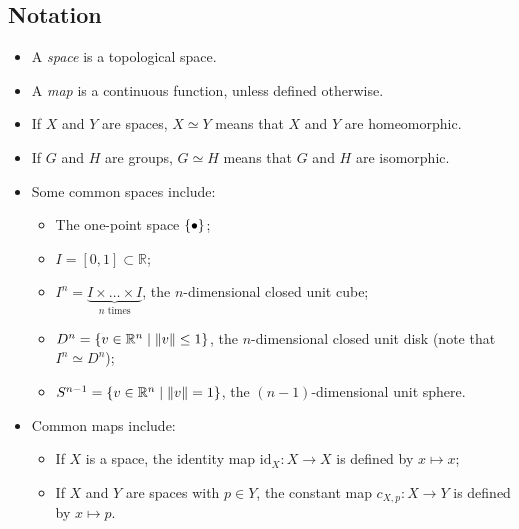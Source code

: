 \subsection{Notation}
\begin{itemize}
	\item A \emph{space} is a topological space.
	\item A \emph{map} is a continuous function, unless defined otherwise.
	\item If \( X \) and \( Y \) are spaces, \( X \simeq Y \) means that \( X \) and \( Y \) are homeomorphic.
	\item If \( G \) and \( H \) are groups, \( G \simeq H \) means that \( G \) and \( H \) are isomorphic.
	\item Some common spaces include:
	\begin{itemize}
		\item The one-point space \( \qty{\bullet} \);
		\item \( I = [0,1] \subset \mathbb R \);
		\item \( I^n = \underbrace{I \times \dots \times I}_{n\text{ times}} \), the \( n \)-dimensional closed unit cube;
		\item \( D^n = \qty{v \in \mathbb R^n \mid \norm{v} \leq 1} \), the \( n \)-dimensional closed unit disk (note that \( I^n \simeq D^n \));
		\item \( S^{n-1} = \qty{v \in \mathbb R^n \mid \norm{v} = 1} \), the \( (n-1) \)-dimensional unit sphere.
	\end{itemize}
	\item Common maps include:
	\begin{itemize}
		\item If \( X \) is a space, the identity map \( \mathrm{id}_X \colon X \to X \) is defined by \( x \mapsto x \);
		\item If \( X \) and \( Y \) are spaces with \( p \in Y \), the constant map \( c_{X,p} \colon X \to Y \) is defined by \( x \mapsto p \).
	\end{itemize}
\end{itemize}
